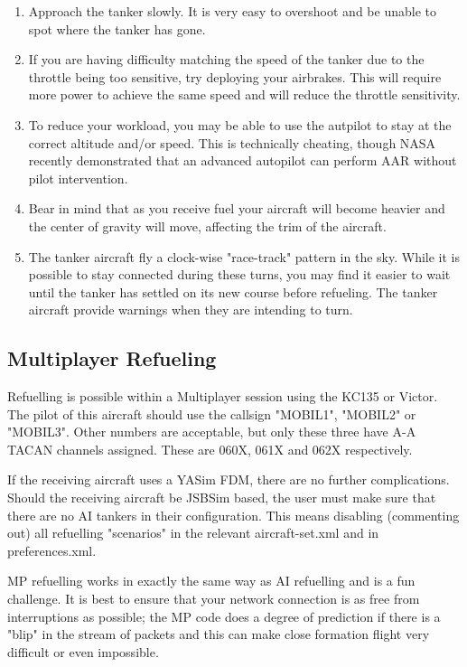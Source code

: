\begin{enumerate}
\item Approach the tanker slowly. It is very easy to overshoot and be unable to
spot where the tanker has gone.
\item If you are having difficulty matching the speed of the tanker due to the
throttle being too sensitive, try deploying your airbrakes. This will require
more power to achieve the same speed and will reduce the throttle sensitivity.
\item To reduce your workload, you may be able to use the autpilot to stay at
the correct altitude and/or speed. This is technically cheating, though NASA
recently demonstrated that an advanced autopilot can perform AAR without pilot
intervention.
\item Bear in mind that as you receive fuel your aircraft will become heavier
and the center of gravity will move, affecting the trim of the aircraft.
\item The tanker aircraft fly a clock-wise "race-track" pattern in the sky.
While it is possible to stay connected during these turns, you may find it
easier to wait until the tanker has settled on its new course before refueling.
The tanker aircraft provide warnings when they are intending to turn.
\end{enumerate}

\subsection{Multiplayer Refueling}

Refuelling is possible within a Multiplayer session using the KC135 or Victor.
The pilot of this aircraft should use the callsign "MOBIL1", "MOBIL2" or "MOBIL3".
Other numbers are acceptable, but only these three have A-A TACAN
channels assigned.  These are 060X, 061X and 062X respectively.

If the receiving aircraft uses a YASim FDM, there are no further
complications.  Should the receiving aircraft be JSBSim based, the user
must make sure that there are no AI tankers in their configuration.
This means disabling (commenting out) all refuelling "scenarios" in the
relevant aircraft-set.xml and in preferences.xml.

MP refuelling works in exactly the same way as AI refuelling and is a
fun challenge.  It is best to ensure that your network connection is as
free from interruptions as possible; the MP code does a degree of
prediction if there is a "blip" in the stream of packets and this can
make close formation flight very difficult or even impossible.

\fi

